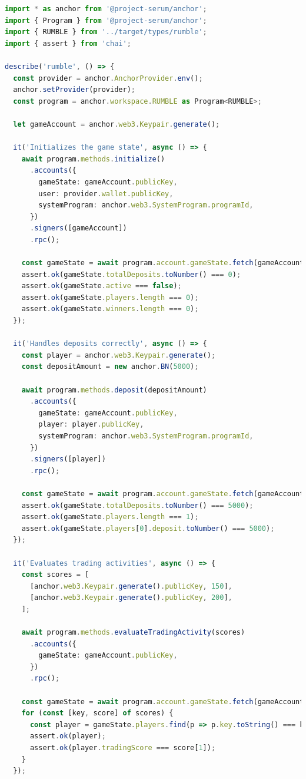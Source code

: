 \documentclass[11pt,a4paper]{article}
\begin{document}
\begin{lstlisting}[language=TypeScript, caption={Smart Contract Test}]
import * as anchor from '@project-serum/anchor';
import { Program } from '@project-serum/anchor';
import { RUMBLE } from '../target/types/rumble';
import { assert } from 'chai';

describe('rumble', () => {
  const provider = anchor.AnchorProvider.env();
  anchor.setProvider(provider);
  const program = anchor.workspace.RUMBLE as Program<RUMBLE>;

  let gameAccount = anchor.web3.Keypair.generate();

  it('Initializes the game state', async () => {
    await program.methods.initialize()
      .accounts({
        gameState: gameAccount.publicKey,
        user: provider.wallet.publicKey,
        systemProgram: anchor.web3.SystemProgram.programId,
      })
      .signers([gameAccount])
      .rpc();

    const gameState = await program.account.gameState.fetch(gameAccount.publicKey);
    assert.ok(gameState.totalDeposits.toNumber() === 0);
    assert.ok(gameState.active === false);
    assert.ok(gameState.players.length === 0);
    assert.ok(gameState.winners.length === 0);
  });

  it('Handles deposits correctly', async () => {
    const player = anchor.web3.Keypair.generate();
    const depositAmount = new anchor.BN(5000);

    await program.methods.deposit(depositAmount)
      .accounts({
        gameState: gameAccount.publicKey,
        player: player.publicKey,
        systemProgram: anchor.web3.SystemProgram.programId,
      })
      .signers([player])
      .rpc();

    const gameState = await program.account.gameState.fetch(gameAccount.publicKey);
    assert.ok(gameState.totalDeposits.toNumber() === 5000);
    assert.ok(gameState.players.length === 1);
    assert.ok(gameState.players[0].deposit.toNumber() === 5000);
  });

  it('Evaluates trading activities', async () => {
    const scores = [
      [anchor.web3.Keypair.generate().publicKey, 150],
      [anchor.web3.Keypair.generate().publicKey, 200],
    ];

    await program.methods.evaluateTradingActivity(scores)
      .accounts({
        gameState: gameAccount.publicKey,
      })
      .rpc();

    const gameState = await program.account.gameState.fetch(gameAccount.publicKey);
    for (const [key, score] of scores) {
      const player = gameState.players.find(p => p.key.toString() === key.toString());
      assert.ok(player);
      assert.ok(player.tradingScore === score[1]);
    }
  });


\end{lstlisting}
\end{document}
